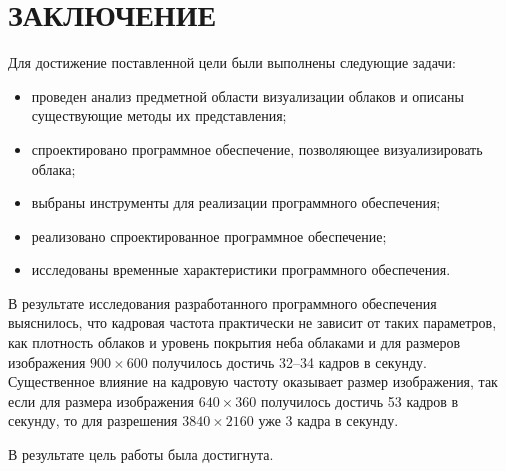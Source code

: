 \chapter*{ЗАКЛЮЧЕНИЕ}

Для достижение поставленной цели были выполнены следующие задачи:
\begin{itemize}
	\item проведен анализ предметной области визуализации облаков и описаны существующие методы их представления;
	\item спроектировано программное обеспечение, позволяющее визуализировать облака;
	\item выбраны инструменты для реализации программного обеспечения;
	\item реализовано спроектированное программное обеспечение;
	\item исследованы временные характеристики программного обеспечения.
\end{itemize}

В результате исследования разработанного программного обеспечения выяснилось, что кадровая частота практически не зависит от таких параметров, как плотность облаков и уровень покрытия неба облаками и для размеров изображения $900 \times 600$ получилось достичь 32--34 кадров в секунду.
Существенное влияние на кадровую частоту оказывает размер изображения, так если для размера изображения $640 \times 360$ получилось достичь 53 кадров в секунду, то для разрешения $3840 \times 2160$ уже 3 кадра в секунду.

В результате цель работы была достигнута.


